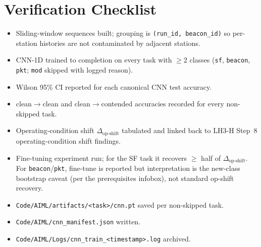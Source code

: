\documentclass[11pt,letterpaper]{article}
\begin{document}
\section{Verification Checklist}
\begin{itemize}[leftmargin=2em]
	\item[$\square$] Sliding-window sequences built; grouping is \texttt{(run\_id, beacon\_id)} so per-station histories are not contaminated by adjacent stations.
	\item[$\square$] CNN-1D trained to completion on every task with $\geq$2 classes (\texttt{sf}, \texttt{beacon}, \texttt{pkt}; \texttt{mod} skipped with logged reason).
	\item[$\square$] Wilson 95\% CI reported for each canonical CNN test accuracy.
	\item[$\square$] clean$\to$clean and clean$\to$contended accuracies recorded for every non-skipped task.
	\item[$\square$] Operating-condition shift $\Delta_{\text{op-shift}}$ tabulated and linked back to LH3-H Step~8 operating-condition shift findings.
	\item[$\square$] Fine-tuning experiment run; for the SF task it recovers $\geq$ half of $\Delta_{\text{op-shift}}$. For \texttt{beacon}/\texttt{pkt}, fine-tune is reported but interpretation is the new-class bootstrap caveat (per the prerequisites infobox), not standard op-shift recovery.
	\item[$\square$] \texttt{Code/AIML/artifacts/<task>/cnn.pt} saved per non-skipped task.
	\item[$\square$] \texttt{Code/AIML/cnn\_manifest.json} written.
	\item[$\square$] \texttt{Code/AIML/Logs/cnn\_train\_<timestamp>.log} archived.
\end{itemize}
\end{document}
